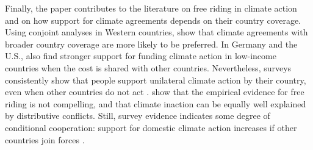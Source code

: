 \documentclass[12pt,english]{article}
\begin{document}
Finally, the paper contributes to the literature on free riding in climate action and on how support for climate agreements depends on their country coverage. 
Using conjoint analyses in Western countries, 
\cite{beiser-mcgrath_could_2019} show that climate agreements with broader country coverage are %
more likely to be preferred. In Germany and the U.S., \cite{gampfer_obtaining_2014} also find stronger support for funding climate action in low-income countries when the cost is shared with other countries. Nevertheless, surveys consistently show that people support unilateral climate action by their country, even when other countries do not act \citep{bernauer_how_2015,mcgrath_how_2017,beiser-mcgrath_commitment_2019%
}. \cite{aklin_prisoners_2020} show that the empirical evidence for free riding is not compelling, and that climate inaction can be equally well explained by distributive conflicts. Still, survey evidence indicates some degree of conditional cooperation: support for domestic climate action increases if other countries join forces \citep{carlsson_importance_2025,tam_they_2025}. 


\end{document}
